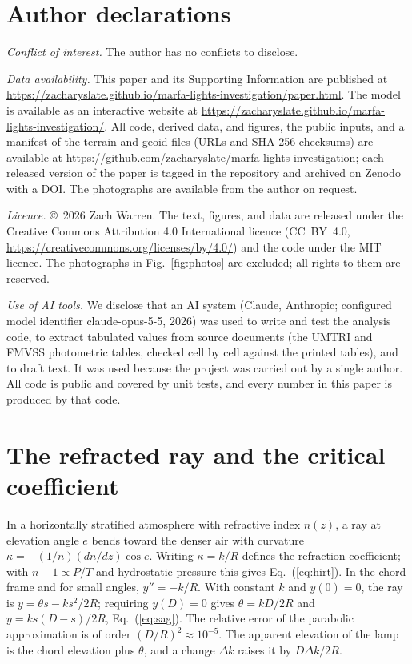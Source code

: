 \documentclass[aip,jap,amsmath,amssymb,reprint,floatfix]{revtex4-2}
\newif\ifanonymous
\newcommand{\repo}{\ifanonymous[repository withheld for review]\else\url{https://github.com/zacharyslate/marfa-lights-investigation}\fi}
\newcommand{\website}{\ifanonymous[website withheld for review; a copy is included in the Supporting Information]\else\url{https://zacharyslate.github.io/marfa-lights-investigation/}\fi}
\begin{document}
\section*{Author declarations}
\textit{Conflict of interest.} The author has no conflicts to disclose.

\textit{Data availability.} This paper and its Supporting Information are published at \url{https://zacharyslate.github.io/marfa-lights-investigation/paper.html}. The model is available as an interactive website at \website. All code, derived data, and figures, the public inputs, and a manifest of the terrain and geoid files (URLs and SHA-256 checksums) are available at \repo; each released version of the paper is tagged in the repository and archived on Zenodo with a DOI. The photographs are available from the author on request.

\textit{Licence.} \copyright~2026 Zach Warren. The text, figures, and data are released under the Creative Commons Attribution 4.0 International licence (CC~BY~4.0, \url{https://creativecommons.org/licenses/by/4.0/}) and the code under the MIT licence. The photographs in Fig.~\ref{fig:photos} are excluded; all rights to them are reserved.

\textit{Use of AI tools.} We disclose that an AI system (Claude, Anthropic; configured model identifier claude-opus-5-5, 2026) was used to write and test the analysis code, to extract tabulated values from source documents (the UMTRI and FMVSS photometric tables, checked cell by cell against the printed tables), and to draft text. It was used because the project was carried out by a single author. All code is public and covered by unit tests, and every number in this paper is produced by that code.

\appendix

\section{The refracted ray and the critical coefficient}\label{app:kcrit}

In a horizontally stratified atmosphere with refractive index $n(z)$, a ray at elevation angle $e$ bends toward the denser air with curvature $\kappa=-(1/n)(dn/dz)\cos e$. Writing $\kappa=k/R$ defines the refraction coefficient; with $n-1\propto P/T$ and hydrostatic pressure this gives Eq.~(\ref{eq:hirt}). In the chord frame and for small angles, $y''=-k/R$. With constant $k$ and $y(0)=0$, the ray is $y=\theta s-ks^2/2R$; requiring $y(D)=0$ gives $\theta=kD/2R$ and $y=ks(D-s)/2R$, Eq.~(\ref{eq:sag}). The relative error of the parabolic approximation is of order $(D/R)^2\approx10^{-5}$. The apparent elevation of the lamp is the chord elevation plus $\theta$, and a change $\Delta k$ raises it by $D\Delta k/2R$.



\end{document}
